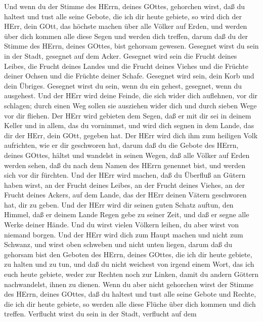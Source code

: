  Und wenn du der Stimme des HErrn, deines GOttes, gehorchen
wirst, daß du haltest und tust alle seine Gebote, die ich dir heute
gebiete, so wird dich der HErr, dein GOtt, das höchste machen über alle
Völker auf Erden,  und werden über dich kommen alle diese
Segen und werden dich treffen, darum daß du der Stimme des HErrn, deines
GOttes, bist gehorsam gewesen.  Gesegnet wirst du sein in
der Stadt, gesegnet auf dem Acker.  Gesegnet wird sein die
Frucht deines Leibes, die Frucht deines Landes und die Frucht deines
Viehes und die Früchte deiner Ochsen und die Früchte deiner Schafe.
 Gesegnet wird sein, dein Korb und dein Übriges.
 Gesegnet wirst du sein, wenn du ein gehest, gesegnet, wenn
du ausgehest.  Und der HErr wird deine Feinde, die sich
wider dich auflehnen, vor dir schlagen; durch einen Weg sollen sie
ausziehen wider dich und durch sieben Wege vor dir fliehen. 
Der HErr wird gebieten dem Segen, daß er mit dir sei in deinem Keller
und in allem, das du vornimmst, und wird dich segnen in dem Lande, das
dir der HErr, dein GOtt, gegeben hat.  Der HErr wird dich
ihm zum heiligen Volk aufrichten, wie er dir geschworen hat, darum daß
du die Gebote des HErrn, deines GOttes, hältst und wandelst in seinen
Wegen,  daß alle Völker auf Erden werden sehen, daß du nach
dem Namen des HErrn genennet bist, und werden sich vor dir fürchten.
 Und der HErr wird machen, daß du Überfluß an Gütern haben
wirst, an der Frucht deines Leibes, an der Frucht deines Viehes, an der
Frucht deines Ackers, auf dem Lande, das der HErr deinen Vätern
geschworen hat, dir zu geben.  Und der HErr wird dir seinen
guten Schatz auftun, den Himmel, daß er deinem Lande Regen gebe zu
seiner Zeit, und daß er segne alle Werke deiner Hände. Und du wirst
vielen Völkern leihen, du aber wirst von niemand borgen. 
Und der HErr wird dich zum Haupt machen und nicht zum Schwanz, und wirst
oben schweben und nicht unten liegen, darum daß du gehorsam bist den
Geboten des HErrn, deines GOttes, die ich dir heute gebiete, zu halten
und zu tun,  und daß du nicht weichest von irgend einem
Wort, das ich euch heute gebiete, weder zur Rechten noch zur Linken,
damit du andern Göttern nachwandelst, ihnen zu dienen. 
Wenn du aber nicht gehorchen wirst der Stimme des HErrn, deines GOttes,
daß du haltest und tust alle seine Gebote und Rechte, die ich dir heute
gebiete, so werden alle diese Flüche über dich kommen und dich treffen.
 Verflucht wirst du sein in der Stadt, verflucht auf dem
